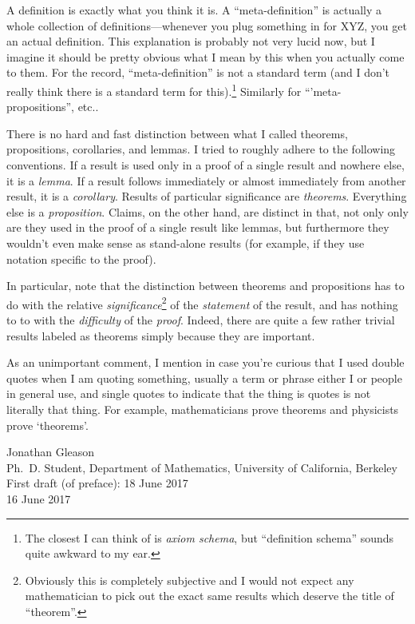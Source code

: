 A definition is exactly what you think it is.  A ``meta-definition'' is actually a whole collection of definitions---whenever you plug something in for XYZ, you get an actual definition.  This explanation is probably not very lucid now, but I imagine it should be pretty obvious what I mean by this when you actually come to them.  For the record, ``meta-definition'' is not a standard term (and I don't really think there is a standard term for this).\footnote{The closest I can think of is \emph{axiom schema}, but ``definition schema'' sounds quite awkward to my ear.}  Similarly for ``'meta-propositions'', etc..

There is no hard and fast distinction between what I called theorems, propositions, corollaries, and lemmas.  I tried to roughly adhere to the following conventions.  If a result is used only in a proof of a single result and nowhere else, it is a \emph{lemma}.  If a result follows immediately or almost immediately from another result, it is a \emph{corollary}.  Results of particular significance are \emph{theorems}.  Everything else is a \emph{proposition}.  Claims, on the other hand, are distinct in that, not only only are they used in the proof of a single result like lemmas, but furthermore they wouldn't even make sense as stand-alone results (for example, if they use notation specific to the proof).

In particular, note that the distinction between theorems and propositions has to do with the relative \emph{significance}\footnote{Obviously this is completely subjective and I would not expect any mathematician to pick out the exact same results which deserve the title of ``theorem''.} of the \emph{statement} of the result, and has nothing to to with the \emph{difficulty} of the \emph{proof}.  Indeed, there are quite a few rather trivial results labeled as theorems simply because they are important.

As an unimportant comment, I mention in case you're curious that I used double quotes when I am quoting something, usually a term or phrase either I or people in general use, and single quotes to indicate that the thing is quotes is not literally that thing.  For example, mathematicians prove theorems and physicists prove `theorems'.

\blankline
\horizontalrule
\blankline

\hfill Jonathan Gleason \\
\hfill Ph.~D. Student, Department of Mathematics, University of California, Berkeley \\
\hfill First draft (of preface):  18 June 2017 \\
\hfill 16 June 2017

